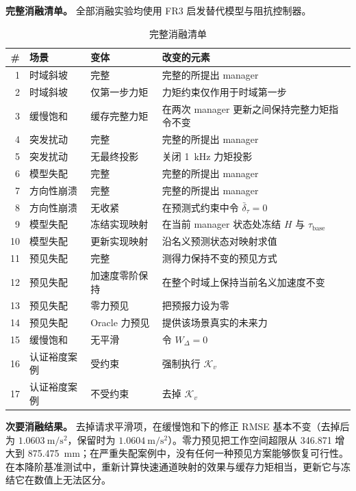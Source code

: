 \documentclass[journal]{IEEEtran}
\begin{document}
\textbf{完整消融清单。} 全部消融实验均使用 FR3 启发替代模型与阻抗控制器。

\begin{table}[t]
\caption{完整消融清单}
\label{tab:ablations}
\centering
\footnotesize
\setlength{\tabcolsep}{3pt}
\begin{tabular}{@{}rp{1.5cm}p{1.7cm}p{2.9cm}@{}}
\toprule
\# & 场景 & 变体 & 改变的元素 \\
\midrule
1 & 时域斜坡 & 完整 & 完整的所提出 manager \\
2 & 时域斜坡 & 仅第一步力矩 & 力矩约束仅作用于时域第一步 \\
3 & 缓慢饱和 & 缓存完整力矩 & 在两次 manager 更新之间保持完整力矩指令不变 \\
4 & 突发扰动 & 完整 & 完整的所提出 manager \\
5 & 突发扰动 & 无最终投影 & 关闭 1~kHz 力矩投影 \\
6 & 模型失配 & 完整 & 完整的所提出 manager \\
7 & 方向性崩溃 & 完整 & 完整的所提出 manager \\
8 & 方向性崩溃 & 无收紧 & 在预测式约束中令 $\bar\delta_\tau=0$ \\
9 & 模型失配 & 冻结实现映射 & 在当前 manager 状态处冻结 $H$ 与 $\tau_{\mathrm{base}}$ \\
10 & 模型失配 & 更新实现映射 & 沿名义预测状态对映射求值 \\
11 & 预见失配 & 完整 & 测得力保持不变的预见方式 \\
12 & 预见失配 & 加速度零阶保持 & 在整个时域上保持当前名义加速度不变 \\
13 & 预见失配 & 零力预见 & 把预报力设为零 \\
14 & 预见失配 & Oracle 力预见 & 提供该场景真实的未来力 \\
15 & 缓慢饱和 & 无平滑 & 令 $W_\Delta=0$ \\
16 & 认证裕度案例 & 受约束 & 强制执行 $\mathcal K_v$ \\
17 & 认证裕度案例 & 不受约束 & 去掉 $\mathcal K_v$ \\
\bottomrule
\end{tabular}
\end{table}

\textbf{次要消融结果。} 去掉请求平滑项，在缓慢饱和下的修正 RMSE 基本不变（去掉后为 $1.0603~\mathrm{m/s^2}$，保留时为 $1.0604~\mathrm{m/s^2}$）。零力预见把工作空间超限从 346.871 增大到 875.475~mm；在严重失配案例中，没有任何一种预见方案能够恢复可行性。在本降阶基准测试中，重新计算快速通道映射的效果与缓存力矩相当，更新它与冻结它在数值上无法区分。
\end{document}
